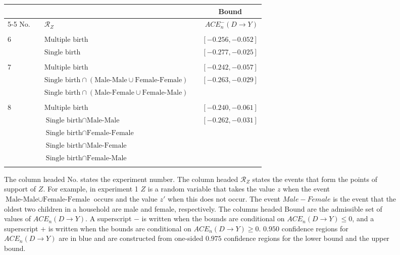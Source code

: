 \documentclass[10pt,a4paper,twoside]{article}
\newcommand{\details}{C:/Users/Jeffro/Dropbox/TeXTemplates/}
\numberwithin{equation}{section}
\begin{document}
\begin{sidewaystable}[p]
\centering
\caption{$\mathcal{R}_Z$ and admissible sets of values of $ACE_n(D\rightarrow Y)$.}
\centering
\begin{subfigure}{\textwidth}
\centering
\begin{tabular}{lclcr}
\toprule
&	& & & \multicolumn{1}{c}{Bound} \\
\cmidrule(r){5-5}	
No.& &	$\mathcal{R}_Z$	&	&	$ACE_n^-(D\rightarrow Y)$\\
\midrule
& &\phantom{$\text{Male-Female}\cup\text{Female-Male}\cup\text{Female-Female}$}\\
6& &$\text{Multiple birth}$&	&	$[-0.256,-0.052]$\\
& &$\text{Single birth}$& &\color{blue}$[-0.277,-0.025]$	\\
\\
7& &$\text{Multiple birth}$&	&	$[-0.242,-0.057]$	\\
& &$\text{Single birth}\cap(\text{Male-Male}\cup\text{Female-Female})$& &\color{blue}$[-0.263,-0.029]$\\
& &$\text{Single birth}\cap(\text{Male-Female}\cup\text{Female-Male})$\\
\\
8& &$\text{Multiple birth}$&	&	$[-0.240,-0.061]$	\\
& &$\text{Single birth}\cap\text{Male-Male}$& &\color{blue}$[-0.262,-0.031]$	\\
& &$\text{Single birth}\cap\text{Female-Female}$\\
& &$\text{Single birth}\cap\text{Male-Female}$ \\
& &$\text{Single birth}\cap\text{Female-Male}$\\
	\\
\bottomrule
\end{tabular}
\vspace{10pt}
\caption{The column headed No. states the experiment number. The column headed $\mathcal{R}_Z$ states the events that form the points of support of $Z$. For example, in experiment 1 $Z$ is a random variable that takes the value $z$ when the event $\text{Male-Male}\cup\text{Female-Female}$ occurs and the value $z'$ when this does not occur. The event $Male-Female$ is the event that the oldest two children in a household are male and female, respectively. The columns headed Bound are the admissible set of values of $ACE_n(D\rightarrow Y)$. A superscript $-$ is written when the bounds are conditional on $ACE_n(D\rightarrow Y)\leq 0$, and a superscript $+$ is written when the bounds are conditional on $ACE_n(D\rightarrow Y)\geq 0$. $0.950$ confidence regions for $ACE_n(D\rightarrow Y)$ are in blue and are constructed from one-sided $0.975$ confidence regions for the lower bound and the upper bound.}
\end{subfigure}
\label{tbl:acemult}
\end{sidewaystable}
\newpage


\end{document}
